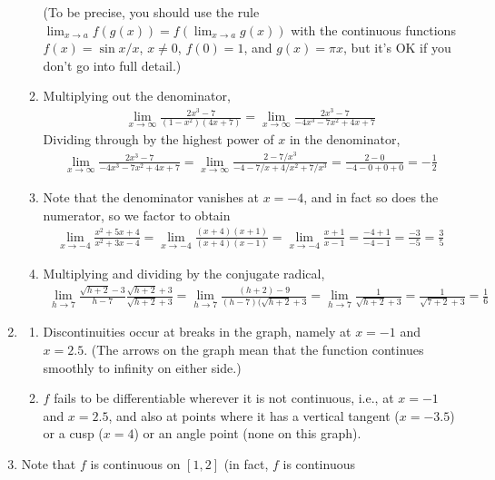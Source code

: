 \documentclass{article}
\begin{document}
\begin{enumerate}
\begin{enumerate}
    (To be precise, you should use the rule $\lim_{x\to a} f(g(x))
    = f(\lim_{x\to a}g(x))$ with the continuous 
    functions $f(x)=\sin x/x$, $x\ne 0$, $f(0)=1$,
    and $g(x)=\pi x$, but it's OK if you don't go into
    full detail.)
  \item Multiplying out the denominator,
    \begin{align*}
      \lim_{x\to\infty} \frac{2x^3-7}{(1-x^2)(4x+7)}
      = \lim_{x\to\infty} \frac{2x^3-7}{-4x^3-7x^2+4x+7}
    \end{align*}
    Dividing through by the highest power of $x$ in the denominator,
    \begin{align*}
      \lim_{x\to\infty} \frac{2x^3-7}{-4x^3-7x^2+4x+7}
      = \lim_{x\to\infty} \frac{2-7/x^3}{-4-7/x+4/x^2+7/x^3}
      = \frac{2-0}{-4-0+0+0} = -\frac{1}{2}
    \end{align*}
  \item Note that the denominator vanishes at $x=-4$, and in fact so
    does the numerator, so we factor to obtain
    \begin{align*}
      \lim_{x\to -4} \frac{x^2+5x+4}{x^2+3x-4}
      = \lim_{x\to -4} \frac{(x+4)(x+1)}{(x+4)(x-1)}
      = \lim_{x\to -4} \frac{x+1}{x-1}
      = \frac{-4+1}{-4-1} = \frac{-3}{-5} = \frac{3}{5}
    \end{align*}
  \item Multiplying and dividing by the conjugate radical,
    \begin{align*}
      \lim_{h\to 7} \frac{\sqrt{h+2}-3}{h-7} 
      \frac{\sqrt{h+2}+3}{\sqrt{h+2}+3}
      = \lim_{h\to 7} \frac{(h+2)-9}{(h-7)(\sqrt{h+2}+3}
      = \lim_{h\to 7} \frac{1}{\sqrt{h+2}+3}
      = \frac{1}{\sqrt{7+2}+3} = \frac{1}{6}
    \end{align*}
  \end{enumerate}
\item 
  \begin{enumerate}
  \item Discontinuities occur at breaks in the graph, namely at $x=-1$
    and $x=2.5$.  (The arrows on the graph mean that the function continues
    smoothly to infinity on either side.)
  \item $f$ fails to be differentiable wherever it is not continuous, i.e.,
    at $x=-1$ and $x=2.5$, and also at points where it has a vertical
    tangent ($x=-3.5$) or a cusp ($x=4$) or an angle point (none on this
    graph).
  \end{enumerate}
\item Note that $f$ is continuous on $[1,2]$ (in fact, $f$ is continuous

\end{enumerate}
\end{document}
